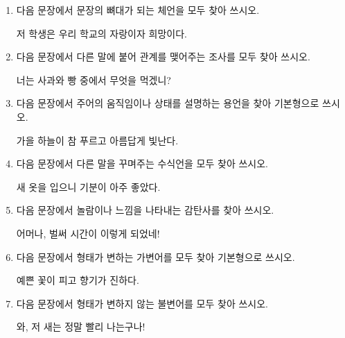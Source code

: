 \documentclass[fs9,seriesRus]{korfarm-base}
\begin{document}
\kfActivityBg \par{}\par\nopagebreak[4]\smallskip\nopagebreak[4]

\kfActivityBg {}
\par{}\par\nopagebreak[4]\smallskip\nopagebreak[4]
\begin{enumerate}[leftmargin=22pt, itemsep=6pt, topsep=4pt, label=\textbf{\arabic*.}]
\item 다음 문장에서 문장의 뼈대가 되는 체언을 모두 찾아 쓰시오.
\begin{kfEvidence}저 학생은 우리 학교의 자랑이자 희망이다.\end{kfEvidence}
\item 다음 문장에서 다른 말에 붙어 관계를 맺어주는 조사를 모두 찾아 쓰시오.
\begin{kfEvidence}너는 사과와 빵 중에서 무엇을 먹겠니?\end{kfEvidence}
\item 다음 문장에서 주어의 움직임이나 상태를 설명하는 용언을 찾아 기본형으로 쓰시오.
\begin{kfEvidence}가을 하늘이 참 푸르고 아름답게 빛난다.\end{kfEvidence}
\item 다음 문장에서 다른 말을 꾸며주는 수식언을 모두 찾아 쓰시오.
\begin{kfEvidence}새 옷을 입으니 기분이 아주 좋았다.\end{kfEvidence}
\item 다음 문장에서 놀람이나 느낌을 나타내는 감탄사를 찾아 쓰시오.
\begin{kfEvidence}어머나, 벌써 시간이 이렇게 되었네!\end{kfEvidence}
\item 다음 문장에서 형태가 변하는 가변어를 모두 찾아 기본형으로 쓰시오.
\begin{kfEvidence}예쁜 꽃이 피고 향기가 진하다.\end{kfEvidence}
\item 다음 문장에서 형태가 변하지 않는 불변어를 모두 찾아 쓰시오.
\begin{kfEvidence}와, 저 새는 정말 빨리 나는구나!\end{kfEvidence}

\end{enumerate}
\end{document}
